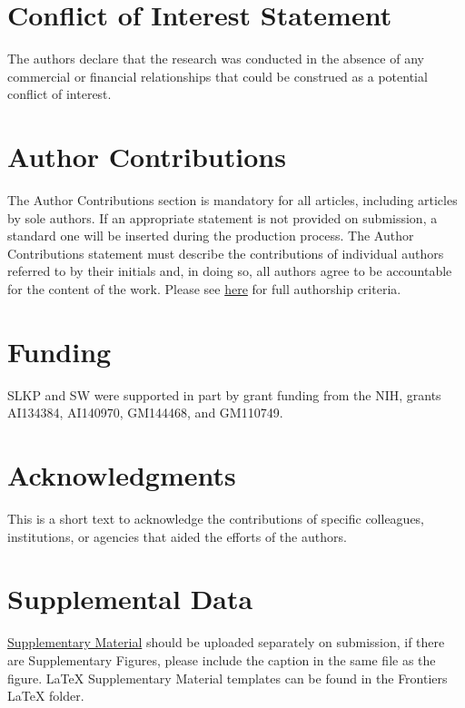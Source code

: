 \documentclass[utf8]{FrontiersinHarvard} %
\begin{document}
\section*{Conflict of Interest Statement}

The authors declare that the research was conducted in the absence of any
commercial or financial relationships that could be construed as a potential
conflict of interest.

\section*{Author Contributions}

The Author Contributions section is mandatory for all articles, including
articles by sole authors. If an appropriate statement is not provided on
submission, a standard one will be inserted during the production process. The
Author Contributions statement must describe the contributions of individual
authors referred to by their initials and, in doing so, all authors agree to be
accountable for the content of the work. Please see
\href{https://www.frontiersin.org/guidelines/policies-and-publication-ethics#authorship-and-author-responsibilities}{here}
for full authorship criteria.

\section*{Funding}
SLKP and SW were supported in part by grant funding from the NIH, grants AI134384, AI140970, GM144468, and GM110749.

\section*{Acknowledgments}
This is a short text to acknowledge the contributions of specific colleagues, institutions, or agencies that aided the efforts of the authors.

\section*{Supplemental Data}
\href{https://www.frontiersin.org/guidelines/author-guidelines#supplementary-material}{Supplementary Material} should be uploaded separately on submission, if there are Supplementary Figures, please include the caption in the same file as the figure. LaTeX Supplementary Material templates can be found in the Frontiers LaTeX folder.
\end{document}

